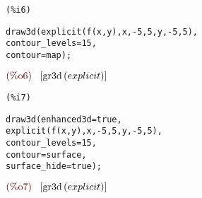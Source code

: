 \documentclass{article}
\begin{document}
\noindent
\begin{minipage}[t]{8ex}{\color{red}\bf
\begin{verbatim}
(%i6) 
\end{verbatim}}
\end{minipage}
\begin{minipage}[t]{\textwidth}{\color{blue}
\begin{verbatim}
draw3d(explicit(f(x,y),x,-5,5,y,-5,5),
contour_levels=15,
contour=map);
\end{verbatim}}
\end{minipage}
\begin{math}\displaystyle
\parbox{8ex}{\color{labelcolor}(\%o6) }
[\mathrm{gr3d}\left( explicit\right) ]
\end{math}


\noindent
\begin{minipage}[t]{8ex}{\color{red}\bf
\begin{verbatim}
(%i7) 
\end{verbatim}}
\end{minipage}
\begin{minipage}[t]{\textwidth}{\color{blue}
\begin{verbatim}
draw3d(enhanced3d=true,
explicit(f(x,y),x,-5,5,y,-5,5),
contour_levels=15,
contour=surface,
surface_hide=true);
\end{verbatim}}
\end{minipage}
\begin{math}\displaystyle
\parbox{8ex}{\color{labelcolor}(\%o7) }
[\mathrm{gr3d}\left( explicit\right) ]
\end{math}
\end{document}
